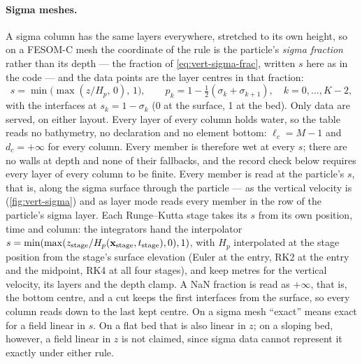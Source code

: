 \paragraph{Sigma meshes.} A sigma column has the same layers everywhere, stretched to its own height, so
on a FESOM-C mesh the coordinate of the rule is the particle's \emph{sigma fraction} rather than its
depth --- the fraction of \cref{eq:vert-sigma-frac}, written $s$ here as in the code --- and the data points
are the layer centres in that fraction:
\begin{equation}\label{eq:vert-uv-sigma}
  s = \min\bigl(\max(z/H_p,\,0),\,1\bigr),\qquad p_k = 1-\tfrac12(\sigma_k+\sigma_{k+1}),\quad k=0,\dots,K-2,
\end{equation}
with the interfaces at $s_k=1-\sigma_k$ (0 at the surface, 1 at the bed). Only 
data are served, on either layout. Every layer of every column holds water, so the table reads no
bathymetry, no declaration and no element bottom: $\ell_c=M-1$ and $d_c=+\infty$ for every column.
Every member is therefore wet at every $s$; there are no walls at depth and none of their fallbacks, and
the record check below requires every layer of every column to be finite. Every member is read at the
particle's $s$, that is, along the sigma surface through the particle --- as the vertical velocity is
(\cref{fig:vert-sigma}) and as layer mode reads every member in the row of the particle's sigma layer.
Each Runge--Kutta stage takes its $s$ from its own position, time and column: the integrators hand the
interpolator $s=\min(\max(z_{\text{stage}}/H_p(\mathbf{x}_{\text{stage}},t_{\text{stage}}),0),1)$, with $H_p$
interpolated at the stage position from the stage's surface elevation (Euler at the entry, RK2 at the
entry and the midpoint, RK4 at all four stages), and keep metres for the vertical velocity, its layers
and the depth clamp. A NaN fraction is read as $+\infty$, that is, the bottom centre, and a
 cut keeps the first interfaces from the surface, so every column reads down to the last
kept centre. On a sigma mesh ``exact'' means exact for a field linear in $s$. On a flat bed that is also
linear in $z$; on a sloping bed, however, a field linear in $z$ is not claimed, since sigma data cannot
represent it exactly under either rule.



